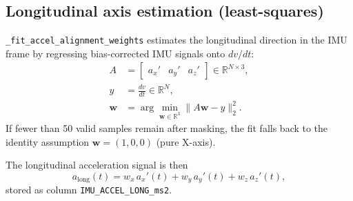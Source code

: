 \documentclass[11pt,a4paper]{article}
\begin{document}
\subsection{Longitudinal axis estimation (least-squares)}
\texttt{\_fit\_accel\_alignment\_weights} estimates the longitudinal direction
in the IMU frame by regressing bias-corrected IMU signals onto $dv/dt$:
\begin{align*}
  A &= \begin{bmatrix} a_x' & a_y' & a_z' \end{bmatrix} \in \mathbb{R}^{N\times 3}, \\
  y &= \frac{dv}{dt} \in \mathbb{R}^{N}, \\[4pt]
  \mathbf{w} &= \arg\min_{\mathbf{w}\in\mathbb{R}^3} \| A\mathbf{w} - y \|_2^2.
\end{align*}
If fewer than 50 valid samples remain after masking, the fit falls back to the
identity assumption $\mathbf{w} = (1, 0, 0)$ (pure X-axis).

The longitudinal acceleration signal is then
\[
  a_\text{long}(t) = w_x\,a_x'(t) + w_y\,a_y'(t) + w_z\,a_z'(t),
\]
stored as column \texttt{IMU\_ACCEL\_LONG\_ms2}.

\end{document}
